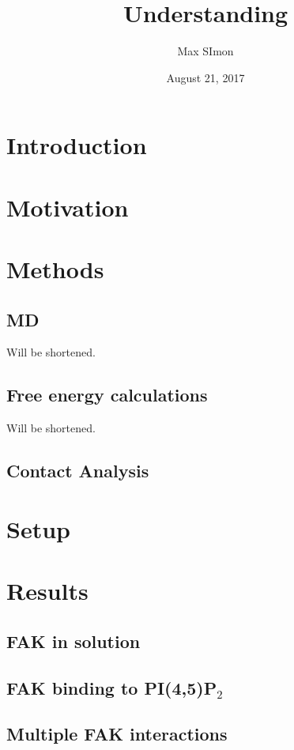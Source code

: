 \documentclass[
12pt, %
parskip=half, %
digital, %
oneside, %
]{bsc}
\title{Understanding}
\author{Max SImon}
\date{August 21, 2017}
\newcommand{\pip}{PI(4,5)P$_2$}
\begin{document}
	
\chapter{Introduction}

\chapter{Motivation}

\chapter{Methods}
\section{MD}
%
Will be shortened.
\section{Free energy calculations}
%
Will be shortened.
\section{Contact Analysis}

\chapter{Setup}

\chapter{Results}
\section{FAK in solution}
\label{sec:fak_sol}

\section{FAK binding to \pip{}}



\section{Multiple FAK interactions}

\end{document}
